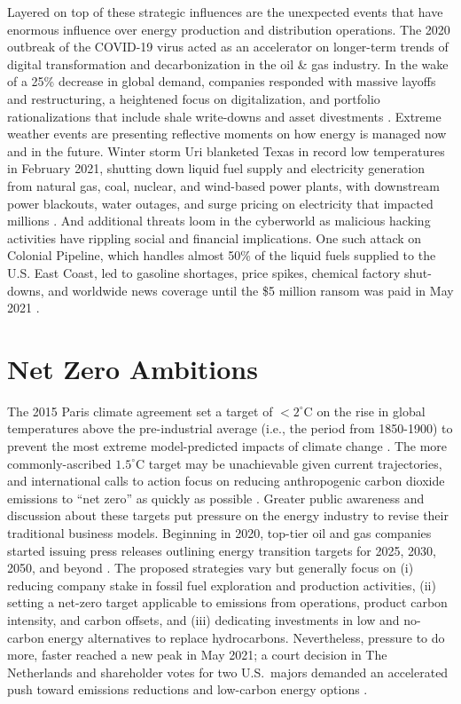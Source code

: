 Layered on top of these strategic influences are the unexpected events that have enormous influence over energy production and distribution operations. The 2020 outbreak of the COVID-19 virus acted as an accelerator on longer-term trends of digital transformation and decarbonization in the oil \& gas industry. In the wake of a 25\% decrease in global demand, companies responded with massive layoffs and restructuring, a heightened focus on digitalization, and portfolio rationalizations that include shale write-downs and asset divestments \citep{deloitte_2021_2020}. Extreme weather events are presenting reflective moments on how energy is managed now and in the future. Winter storm Uri blanketed Texas in record low temperatures in February 2021, shutting down liquid fuel supply and electricity generation from natural gas, coal, nuclear, and wind-based power plants, with downstream power blackouts, water outages, and surge pricing on electricity that impacted millions \citep{harc_winter_2021,lazard_lazards_2020}. And additional threats loom in the cyberworld as malicious hacking activities have rippling social and financial implications. One such attack on Colonial Pipeline, which handles almost 50\% of the liquid fuels supplied to the U.S. East Coast, led to gasoline shortages, price spikes, chemical factory shut-downs, and worldwide news coverage until the \$5 million ransom was paid in May 2021 \citep{sanger_pipeline_2021}.

\section{Net Zero Ambitions}\label{ch1:netzero}
The 2015 Paris climate agreement set a target of $<2^\circ$C on the rise in global temperatures above the pre-industrial average (i.e., the period from 1850-1900) to prevent the most extreme model-predicted impacts of climate change \citep{unfccc_paris_2015}. The more commonly-ascribed $1.5^\circ$C target may be unachievable given current trajectories, and international calls to action focus on reducing anthropogenic carbon dioxide emissions to “net zero” as quickly as possible \citep{ipcc_global_2018}. Greater public awareness and discussion about these targets put pressure on the energy industry to revise their traditional business models. Beginning in 2020, top-tier oil and gas companies started issuing press releases outlining energy transition targets for 2025, 2030, 2050, and beyond \citep{bp_international_2020,chevron_chevron_2021,conocophillips_conocophillips_2020,equinor_equinor_2020,exxonmobil_exxonmobil_2021,shell_responsible_2020,shell_shell_2021,total_total_2020,total_2020_2021}. The proposed strategies vary but generally focus on (i) reducing company stake in fossil fuel exploration and production activities, (ii) setting a net-zero target applicable to emissions from operations, product carbon intensity, and carbon offsets, and (iii) dedicating investments in low and no-carbon energy alternatives to replace hydrocarbons. Nevertheless, pressure to do more, faster reached a new peak in May 2021; a court decision in The Netherlands and shareholder votes for two U.S.\ majors demanded an accelerated push toward emissions reductions and low-carbon energy options \citep{mcwilliams_investors_2021}.

